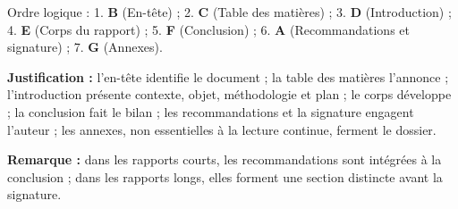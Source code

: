 \documentclass[11pt]{article}
\begin{document}
\begin{corrige}
Ordre logique : 1. \textbf{B} (En-tête) ; 2. \textbf{C} (Table des matières) ; 3. \textbf{D} (Introduction) ; 4. \textbf{E} (Corps du rapport) ; 5. \textbf{F} (Conclusion) ; 6. \textbf{A} (Recommandations et signature) ; 7. \textbf{G} (Annexes).

\textbf{Justification :} l'en-tête identifie le document ; la table des matières l'annonce ; l'introduction présente contexte, objet, méthodologie et plan ; le corps développe ; la conclusion fait le bilan ; les recommandations et la signature engagent l'auteur ; les annexes, non essentielles à la lecture continue, ferment le dossier.

\textbf{Remarque :} dans les rapports courts, les recommandations sont intégrées à la conclusion ; dans les rapports longs, elles forment une section distincte avant la signature.
\end{corrige}
\end{document}
